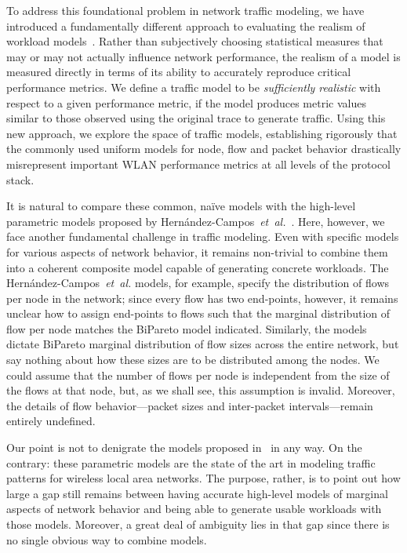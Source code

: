 \documentclass[conference]{IEEEtran}
\newcommand{\caps}[1]{{\small{#1}}}
\newcommand{\FHC}{Hern\'andez-Campos~\textit{et~al.}}
\begin{document}
To address this foundational problem in network traffic modeling, we have introduced a fundamentally different approach to evaluating the realism of workload models~\cite{Karpinski07:realism,Karpinski07:cbr-failure}. Rather than subjectively choosing statistical measures that may or may not actually influence network performance, the realism of a model is measured directly in terms of its ability to accurately reproduce critical performance metrics. We define a traffic model to be \textit{sufficiently realistic} with respect to a given performance metric, if the model produces metric values similar to those observed using the original trace to generate traffic. Using this new approach, we explore the space of traffic models, establishing rigorously that the commonly used uniform models for node, flow and packet behavior drastically misrepresent important \caps{WLAN} performance metrics at all levels of the protocol stack.

It is natural to compare these common, na\"ive models with the high-level parametric models proposed by \FHC~\cite{Hernandez06:wlan-traffic}. Here, however, we face another fundamental challenge in traffic modeling. Even with specific models for various aspects of network behavior, it remains non-trivial to combine them into a coherent composite model capable of generating concrete workloads. The {\FHC} models, for example, specify the distribution of flows per node in the network; since every flow has two end-points, however, it remains unclear how to assign end-points to flows such that the marginal distribution of flow per node matches the BiPareto model indicated. Similarly, the models dictate BiPareto marginal distribution of flow sizes across the entire network, but say nothing about how these sizes are to be distributed among the nodes. We could assume that the number of flows per node is independent from the size of the flows at that node, but, as we shall see, this assumption is invalid. Moreover, the details of flow behavior---packet sizes and inter-packet intervals---remain entirely undefined.

Our point is not to denigrate the models proposed in~\cite{Hernandez06:wlan-traffic} in any way. On the contrary: these parametric models are the state of the art in modeling traffic patterns for wireless local area networks. The purpose, rather, is to point out how large a gap still remains between having accurate high-level models of marginal aspects of network behavior and being able to generate usable workloads with those models. Moreover, a great deal of ambiguity lies in that gap since there is no single obvious way to combine models.
\end{document}
